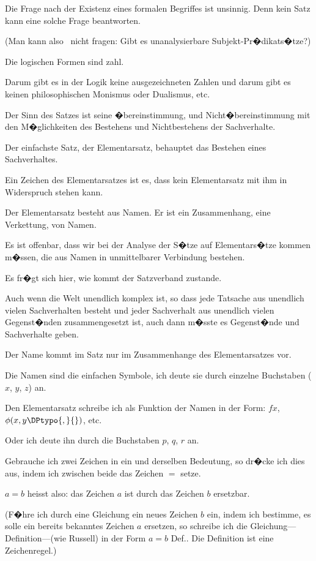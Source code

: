 {Die Frage nach der Existenz eines formalen
Begriffes ist unsinnig. Denn kein Satz kann eine
solche Frage beantworten.

(Man kann also \zumBeispiel\ nicht fragen: \glqq{}Gibt es
unanalysierbare Sub\-jekt-Pr�\-di\-kat\-s�t\-ze?\grqq{})}


{Die logischen Formen sind zahl.

Darum gibt es in der Logik keine ausgezeichneten
Zahlen und darum gibt es keinen philosophischen
Monismus oder Dualismus, etc.}


{Der Sinn des Satzes ist seine �bereinstimmung,
und Nicht�bereinstimmung mit den M�glichkeiten
des Bestehens und Nichtbestehens der
Sachverhalte.}


{Der einfachste Satz, der Elementarsatz, behauptet
das Bestehen eines Sachverhaltes.}


{Ein Zeichen des Elementarsatzes ist es, dass
kein Elementarsatz mit ihm in Widerspruch stehen
kann.}


{Der Elementarsatz besteht aus Namen. Er ist
ein Zusammenhang, eine Verkettung, von Namen.}


{Es ist offenbar, dass wir bei der Analyse der
S�tze auf Elementars�tze kommen m�ssen, die aus
Namen in unmittelbarer Verbindung bestehen.

Es fr�gt sich hier, wie kommt der Satzverband
zustande.}


{Auch wenn die Welt unendlich komplex ist,
so dass jede Tatsache aus unendlich vielen Sachverhalten
besteht und jeder Sachverhalt aus unendlich
vielen Gegenst�nden zusammengesetzt ist,
auch dann m�sste es Gegenst�nde und Sachverhalte
geben.}


{Der Name kommt im Satz nur im Zusammenhange
des Elementarsatzes vor.}


{Die Namen sind die einfachen Symbole, ich
deute sie durch einzelne Buchstaben (\glqq{}$x$\grqq{}, \glqq{}$y$\grqq{}, \glqq{}$z$\grqq{})
an.

Den Elementarsatz schreibe ich als Funktion
der Namen in der Form: \glqq{}$fx$\grqq{}, \glqq{}$\phi(x,y\DPtypo{,}{})$\grqq{}, etc.

Oder ich deute ihn durch die Buchstaben $p$, $q$,
$r$ an.}


{Gebrauche ich zwei Zeichen in ein und derselben
Bedeutung, so dr�cke ich dies aus, indem
ich zwischen beide das Zeichen \glqq{}$=$\grqq{} setze.

\glqq{}$a = b$\grqq{} heisst also: das Zeichen \glqq{}$a$\grqq{} ist durch
das Zeichen \glqq{}$b$\grqq{} ersetzbar.

(F�hre ich durch eine Gleichung ein neues
Zeichen \glqq{}$b$\grqq{} ein, indem ich bestimme, es solle ein
bereits bekanntes Zeichen \glqq{}$a$\grqq{} ersetzen, so schreibe
ich die Gleichung---Definition---(wie Russell) in
der Form \glqq{}$a = b$ Def.\grqq{}. Die Definition ist eine
Zeichenregel.)}


